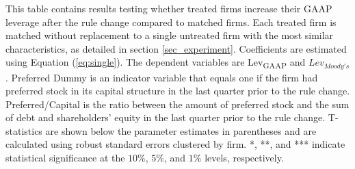 \documentclass[a4paper, 12pt]{article}
\begin{document}
\begin{table}[htbp]
\caption{\textbf{The Effect of Rule Change on Leverage - One Matched Firm with No Replacement}
} \label{table_lev_alt}
\begin{singlespace}
\begin{small}

\noindent This table contains results testing whether treated firms increase their GAAP leverage after the rule change compared to matched firms. Each treated firm is matched without replacement to a single untreated firm with the most similar characteristics, as detailed in section \ref{sec_experiment}. Coefficients are estimated using Equation (\ref{eq:single}). The dependent variables are Lev\textsubscript{GAAP} and $Lev_{Moody's}$. Preferred Dummy is an indicator variable that equals one if the firm had preferred stock in its capital structure in the last quarter prior to the rule change. Preferred/Capital is the ratio between the amount of preferred stock and the sum of debt and shareholders' equity in the last quarter prior to the rule change. T-statistics are shown below the parameter estimates in parentheses and are calculated using robust standard errors clustered by firm. *, **, and *** indicate statistical significance at the $10\%$, $5\%$, and $1\%$ levels, respectively.

\end{small}
\end{singlespace}
\vspace{3mm}
\small
  \centering
\end{table}


\clearpage

\newpage
\end{document}
